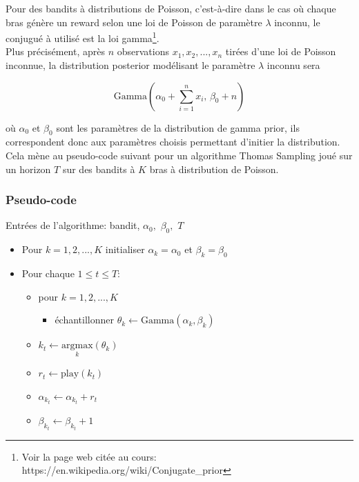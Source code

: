 \documentclass[letterpaper,11pt]{article}
\begin{document}
Pour des bandits à distributions de Poisson, c'est-à-dire dans le cas où chaque bras génère un reward selon une loi de Poisson de paramètre $\lambda$ inconnu, le conjugué à utilisé est la loi gamma\footnote{Voir la page web citée au cours: https://en.wikipedia.org/wiki/Conjugate\_prior}.\\

Plus précisément, après $n$ observations $x_1,x_2,...,x_n$ tirées d'une loi de Poisson inconnue, la distribution posterior modélisant le paramètre $\lambda$ inconnu sera

\begin{equation}
\mathrm{Gamma}\left(\alpha_0 + \sum_{i=1}^n x_i,\,\beta_0 + n\right)
\end{equation}

où $\alpha_0$ et $\beta_0$ sont les paramètres de la distribution de gamma prior, ils correspondent donc aux paramètres choisis permettant d'initier la distribution.\\

Cela mène au pseudo-code suivant pour un algorithme Thomas Sampling joué sur un horizon $T$ sur des bandits à $K$ bras à distribution de Poisson.

\subsubsection{Pseudo-code}

Entrées de l'algorithme: bandit, $\alpha_0,$ $\beta_0,$ $T$\\

\begin{itemize}
\setlength\itemsep{0.2cm}

\item
Pour $k=1,2,...,K$ initialiser $\alpha_k=\alpha_0$ et $\beta_k=\beta_0$

\item Pour chaque $1\leq t \leq T :$

\begin{itemize}
\item
pour $k=1,2,...,K$ 

\begin{itemize}
\item
échantillonner $\theta_k \leftarrow \mathrm{Gamma}(\alpha_k,\beta_k)$

\end{itemize}

\item
$k_t\leftarrow \underset{k}{\mathrm{argmax}} (\theta_{k})$ 

\item
$r_t\leftarrow \mathrm{play}(k_t)$ 

\item 
$\alpha_{k_t} \leftarrow \alpha_{k_t}+r_t$

\item
$\beta_{k_t} \leftarrow \beta_{k_t}+1$

\end{itemize}

\end{itemize}
\end{document}
